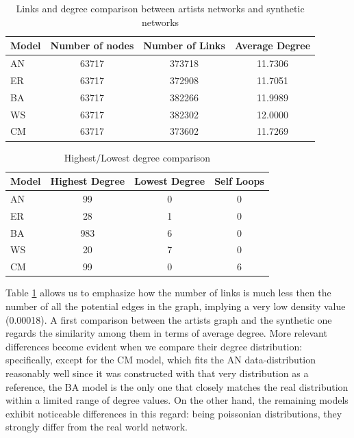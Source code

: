 \documentclass[sigchi]{acmart}
\begin{document}
\renewcommand{\arraystretch}{1.1}
\begin{table}[H]
\begin{center}
\scriptsize
\begin{tabular}{ |l|c|c|c| } 
 \hline
 \textbf{Model} & \textbf{Number of nodes} & \textbf{Number of Links} & \textbf{Average Degree}\\
 \hline
 AN & 63717 & 373718 & 11.7306\\
 ER & 63717 & 372908 & 11.7051\\
 BA & 63717 & 382266 & 11.9989\\
 WS & 63717 & 382302 & 12.0000\\
 CM & 63717 & 373602 & 11.7269\\
 
 \hline
\end{tabular}
\end{center}
\caption{\label{table:basic_comp} Links and degree comparison between artists networks and synthetic networks}
\end{table}

\renewcommand{\arraystretch}{1.1}
\begin{table}[H]
\begin{center}
\scriptsize
\begin{tabular}{ |l|c|c|c| } 
 \hline
 \textbf{Model} & \textbf{Highest Degree} & \textbf{Lowest Degree} & \textbf{Self Loops}\\
 \hline
 AN & 99 & 0 & 0\\
 ER & 28 & 1 & 0\\
 BA & 983 & 6 & 0\\
 WS & 20 & 7 & 0\\
 CM & 99 & 0 & 6\\
 
 \hline
\end{tabular}
\end{center}
\caption{\label{table:deg}Highest/Lowest degree comparison}
\end{table}

Table \ref{table:basic_comp} allows us to emphasize how the number of links is much less then the number of all the potential edges in the graph, implying a very low density value (0.00018). A first comparison between the artists graph and the synthetic one regards the similarity among them in terms of average degree. More relevant differences become evident when we compare their degree distribution: specifically, except for the CM model, which fits the AN data-distribution reasonably well since it was constructed with that very distribution as a reference, the BA model is the only one that closely matches the real distribution within a limited range of degree values. On the other hand, the remaining models exhibit noticeable differences in this regard: being poissonian distributions, they strongly differ from the real world network.
\end{document}
